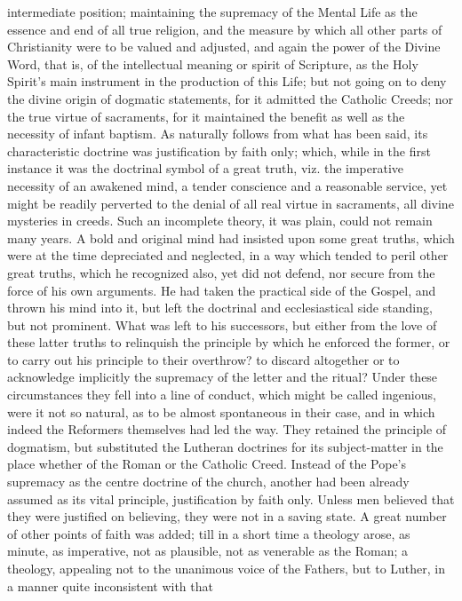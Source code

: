 intermediate position; maintaining the supremacy of the Mental Life as
the essence and end of all true religion, and the measure by which all
other parts of Christianity were to be valued and adjusted, and again
the power of the Divine Word, that is, of the intellectual meaning or
spirit of Scripture, as the Holy Spirit's main instrument in the
production of this Life; but not going on to deny the divine origin of
dogmatic statements, for it admitted the Catholic Creeds; nor the true
virtue of sacraments, for it maintained the benefit as well as the
necessity of infant baptism. As naturally follows from what has been
said, its characteristic doctrine was justification by faith only;
which, while in the first instance it was the doctrinal symbol of a
great truth, viz. the imperative necessity of an awakened mind, a tender
conscience and a reasonable service, yet might be readily perverted to
the denial of all real virtue in sacraments, all divine mysteries in
creeds. Such an incomplete theory, it was plain, could not remain many
years. A bold and original mind had insisted upon some great truths,
which were at the time depreciated and neglected, in a way which tended
to peril other great truths, which he recognized also, yet did not
defend, nor secure from the force of his own arguments. He had taken the
practical side of the Gospel, and thrown his mind into it, but left the
doctrinal and ecclesiastical side standing, but not prominent. What was
left to his successors, but either from the love of these latter truths
to relinquish the principle by which he enforced the former, or to carry
out his principle to their overthrow? to discard altogether or to
acknowledge implicitly the supremacy of the letter and the ritual? Under
these circumstances they fell into a line of conduct, which might be
called ingenious, were it not so natural, as to be almost spontaneous in
their case, and in which indeed the Reformers themselves had led the
way. They retained the principle of dogmatism, but substituted the
Lutheran doctrines for its subject-matter in the place whether of the
Roman or the Catholic Creed. Instead of the Pope's supremacy as the
centre doctrine of the church, another had been already assumed as
its vital principle, justification by faith only. Unless men believed
that they were justified on believing, they were not in a saving state.
A great number of other points of faith was added; till in a short time
a theology arose, as minute, as imperative, not as plausible, not as
venerable as the Roman; a theology, appealing not to the unanimous voice
of the Fathers, but to Luther, in a manner quite inconsistent with that

